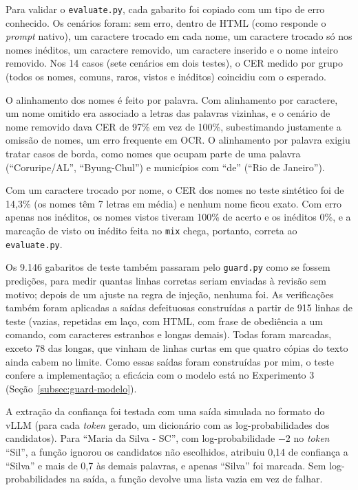\documentclass[12pt,a4paper]{article}
\begin{document}
Para validar o \texttt{evaluate.py}, cada gabarito foi copiado com um tipo de erro conhecido. Os cenários foram: sem erro, dentro de HTML (como responde o \emph{prompt} nativo), um caractere trocado em cada nome, um caractere trocado só nos nomes inéditos, um caractere removido, um caractere inserido e o nome inteiro removido. Nos 14 casos (sete cenários em dois testes), o CER medido por grupo (todos os nomes, comuns, raros, vistos e inéditos) coincidiu com o esperado.

O alinhamento dos nomes é feito por palavra. Com alinhamento por caractere, um nome omitido era associado a letras das palavras vizinhas, e o cenário de nome removido dava CER de 97\% em vez de 100\%, subestimando justamente a omissão de nomes, um erro frequente em OCR. O alinhamento por palavra exigiu tratar casos de borda, como nomes que ocupam parte de uma palavra (``Coruripe/AL'', ``Byung-Chul'') e municípios com ``de'' (``Rio de Janeiro'').

Com um caractere trocado por nome, o CER dos nomes no teste sintético foi de 14,3\% (os nomes têm 7 letras em média) e nenhum nome ficou exato. Com erro apenas nos inéditos, os nomes vistos tiveram 100\% de acerto e os inéditos 0\%, e a marcação de visto ou inédito feita no \texttt{mix} chega, portanto, correta ao \texttt{evaluate.py}.

Os 9.146 gabaritos de teste também passaram pelo \texttt{guard.py} como se fossem predições, para medir quantas linhas corretas seriam enviadas à revisão sem motivo; depois de um ajuste na regra de injeção, nenhuma foi. As verificações também foram aplicadas a saídas defeituosas construídas a partir de 915 linhas de teste (vazias, repetidas em laço, com HTML, com frase de obediência a um comando, com caracteres estranhos e longas demais). Todas foram marcadas, exceto 78 das longas, que vinham de linhas curtas em que quatro cópias do texto ainda cabem no limite. Como essas saídas foram construídas por mim, o teste confere a implementação; a eficácia com o modelo está no Experimento 3 (Seção~\ref{subsec:guard-modelo}).

A extração da confiança foi testada com uma saída simulada no formato do vLLM (para cada \emph{token} gerado, um dicionário com as log-probabilidades dos candidatos). Para ``Maria da Silva - SC'', com log-probabilidade $-2$ no \emph{token} ``Sil'', a função ignorou os candidatos não escolhidos, atribuiu 0,14 de confiança a ``Silva'' e mais de 0,7 às demais palavras, e apenas ``Silva'' foi marcada. Sem log-probabilidades na saída, a função devolve uma lista vazia em vez de falhar.
\end{document}
